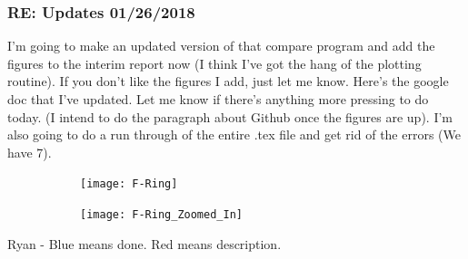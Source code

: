 \documentclass[crop=false,class=article,oneside]{standalone}
\begin{document}
\subsubsection{\footnotesize RE: Updates 01/26/2018}
I'm going to make an updated version of that compare program and add the figures to the interim report now (I think I've got the hang of the plotting routine). If you don't like the figures I add, just let me know. Here's the google doc that I've updated. Let me know if there's anything more pressing to do today. (I intend to do the paragraph about Github once the figures are up). I'm also going to do a run through of the entire .tex file and get rid of the errors (We have 7).
\begin{figure}[H]
    \centering
    \begin{subfigure}[b]{0.49\textwidth}
        \texttt{[image: F-Ring]}
    \end{subfigure}
    \begin{subfigure}[b]{0.49\textwidth}
        \texttt{[image: F-Ring\_Zoomed\_In]}
    \end{subfigure}
\end{figure}
Ryan - Blue means done. Red means description.
\end{document}
